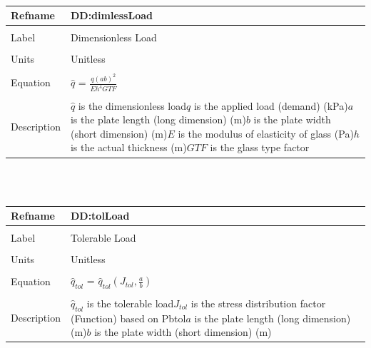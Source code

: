 \documentclass[12pt]{article}
\begin{document}
~\newline
\noindent \begin{minipage}{\textwidth}
\begin{tabular}{p{} p{}}
\toprule \textbf{Refname} & \textbf{DD:dimlessLoad}
\label{DD:dimlessLoad}
\\ \midrule \\
Label & Dimensionless Load
\\ \midrule \\
Units & Unitless
\\ \midrule \\
Equation & $\hat{q}$ = $\frac{q \left(a b\right)^{2}}{E h^{4} GTF}$
\\ \midrule \\
Description & $\hat{q}$ is the dimensionless load\newline$q$ is the applied load (demand) (kPa)\newline$a$ is the plate length (long dimension) (m)\newline$b$ is the plate width (short dimension) (m)\newline$E$ is the modulus of elasticity of glass (Pa)\newline$h$ is the actual thickness (m)\newline$GTF$ is the glass type factor
\\ \bottomrule \end{tabular}
\end{minipage}\\
~\newline
\noindent \begin{minipage}{\textwidth}
\begin{tabular}{p{} p{}}
\toprule \textbf{Refname} & \textbf{DD:tolLoad}
\label{DD:tolLoad}
\\ \midrule \\
Label & Tolerable Load
\\ \midrule \\
Units & Unitless
\\ \midrule \\
Equation & ${\hat{q}_{tol}}$ = ${\hat{q}_{tol}}\left({J_{tol}},\frac{a}{b}\right)$
\\ \midrule \\
Description & ${\hat{q}_{tol}}$ is the tolerable load\newline${J_{tol}}$ is the stress distribution factor (Function) based on Pbtol\newline$a$ is the plate length (long dimension) (m)\newline$b$ is the plate width (short dimension) (m)
\\ \bottomrule \end{tabular}
\end{minipage}\\
\end{document}
